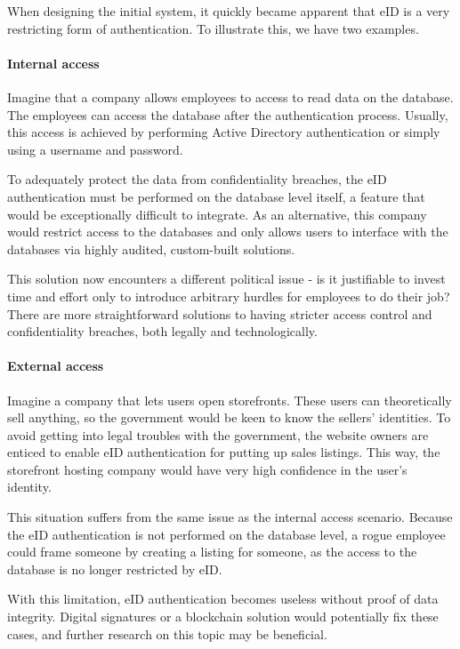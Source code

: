 When designing the initial system, it quickly became apparent that eID is a very restricting form of authentication. To illustrate this, we have two examples.

\paragraph{Internal access} Imagine that a company allows employees to access to read data on the database. The employees can access the database after the authentication process. Usually, this access is achieved by performing Active Directory authentication or simply using a username and password.

To adequately protect the data from confidentiality breaches, the eID authentication must be performed on the database level itself, a feature that would be exceptionally difficult to integrate. As an alternative, this company would restrict access to the databases and only allows users to interface with the databases via highly audited, custom-built solutions.

This solution now encounters a different political issue - is it justifiable to invest time and effort only to introduce arbitrary hurdles for employees to do their job? There are more straightforward solutions to having stricter access control and confidentiality breaches, both legally and technologically.

\paragraph{External access}

Imagine a company that lets users open storefronts. These users can theoretically sell anything, so the government would be keen to know the sellers' identities. To avoid getting into legal troubles with the government, the website owners are enticed to enable eID authentication for putting up sales listings. This way, the storefront hosting company would have very high confidence in the user's identity.

This situation suffers from the same issue as the internal access scenario. Because the eID authentication is not performed on the database level, a rogue employee could frame someone by creating a listing for someone, as the access to the database is no longer restricted by eID.

With this limitation, eID authentication becomes useless without proof of data integrity. Digital signatures or a blockchain solution would potentially fix these cases, and further research on this topic may be beneficial.

